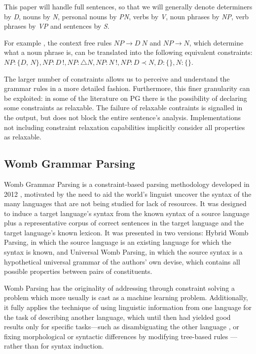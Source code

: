 \documentclass{llncs}
\newcommand{\constituency}[2]{\textit{#1} : \textit{#2}}
\newcommand{\obligation}[2]{\textit{#1} : \triangle \textit{#2}}
\newcommand{\uniqueness}[2]{\textit{#1} : \textit{#2}\,!}
\newcommand{\precedence}[3]{\textit{#1} : \textit{#2} \prec \textit{#3}}
\newcommand{\PN}{\textit{PN}\xspace}
\newcommand{\NP}{\textit{NP}\xspace}
\newcommand{\VP}{\textit{VP}\xspace}
\newcommand{\Se}{\textit{S}\xspace}
\newcommand{\N}{\textit{N}\xspace}
\newcommand{\V}{\textit{V}\xspace}
\newcommand{\D}{\textit{D}\xspace}
\begin{document}
This paper will handle full sentences, so that we will generally denote determiners by \D, nouns by \N, personal nouns by \PN, verbs by \V, noun phrases by \NP, verb phrases by \VP and sentences by \Se.

\begin{example} For example \cite{DBLP:conf/fg/DuchierDPL10}, the context free rules $\NP\to D\ N$ and $\NP \to N$, which determine what a noun phrase is, can be translated into the following equivalent constraints: $\constituency{NP}{\{D, N\}}, \uniqueness{NP}{D}, \obligation{NP}{N}, \uniqueness{NP}{N}, \precedence{NP}{D}{N}, \constituency{D}{\{\}}, \constituency{N}{\{\}}$.
\end{example}

The larger number of constraints allows us to perceive and understand the grammar rules in a more detailed fashion. Furthermore, this finer granularity can be exploited: in some of the literature on PG there is the possibility of declaring some constraints as relaxable. The failure of relaxable contraints is signalled in the output, but does not block the entire sentence's analysis.  Implementations not including constraint relaxation capabilities implicitly consider all properties as relaxable.


 
%
\subsection{Womb Grammar Parsing}

%
 Womb Grammar Parsing   is a constraint-based parsing methodology developed in 2012 \cite {DM12}, motivated by the need to aid the world's linguist uncover the syntax of the many languages that are not being studied for lack of resources.
It was designed to induce a target language's syntax from the known syntax of a source language plus a representative corpus of correct sentences in the target language and the target language's known lexicon.  It was presented in two versions: Hybrid Womb Parsing, in which the source language is an existing language for which the syntax is known, and Universal Womb Parsing,  in which the source syntax is a hypothetical universal grammar of the authors' own devise, which contains all possible properties between pairs of constituents.

Womb Parsing has the originality of addressing through constraint solving a problem  which more usually is cast as a machine learning problem. Additionally, it fully applies the technique of using  linguistic information from one language for the task of describing another language, which until then had  yielded good results only for specific tasks---such as disambiguating the other language \cite{BurkKlein:2008}, or fixing morphological or syntactic differences by modifying tree-based rules \cite{Nicolas:towardsefficient}---rather than for syntax induction.
\end{document}
